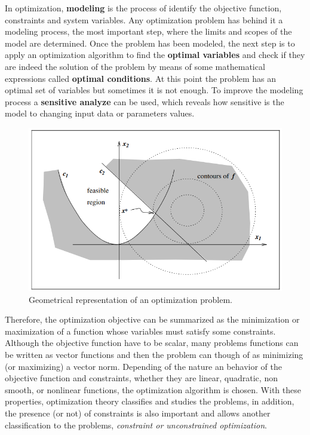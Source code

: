 In optimization, \textbf{modeling} is the process of identify the objective function, constraints and system variables. Any optimization problem has behind it a modeling process, the most important step, where the limits and scopes of the model are determined. Once the problem has been modeled, the next step is to apply an optimization algorithm to find the \textbf{optimal variables} and check if they are indeed the solution of the problem by means of some mathematical expressions called \textbf{optimal conditions}. At this point the problem has an optimal set of variables but sometimes it is not enough. To improve the modeling process a \textbf{sensitive analyze} can be used, which reveals how sensitive is the model to changing input data or parameters  values. 

\begin{figure}[H]
    \centering
    \includegraphics[scale=0.65]{Images/problem_opt.png}
    \caption{Geometrical representation of an optimization problem. \cite{numerical_opt}}
    \label{fig:opt_problem}
\end{figure}


Therefore, the optimization objective can be summarized as the minimization or maximization of a function whose variables must satisfy some constraints. Although the objective function have to be scalar, many problems functions can be written as vector functions and then the problem can though of as minimizing (or maximizing) a vector norm. Depending of the nature an behavior of the objective function and constraints, whether they are linear, quadratic, non smooth, or nonlinear functions, the optimization algorithm is chosen. With these properties, optimization theory classifies and studies the problems, in addition, the presence (or not) of constraints is also important and allows another classification to the problems,  \textit{constraint or unconstrained optimization}.

